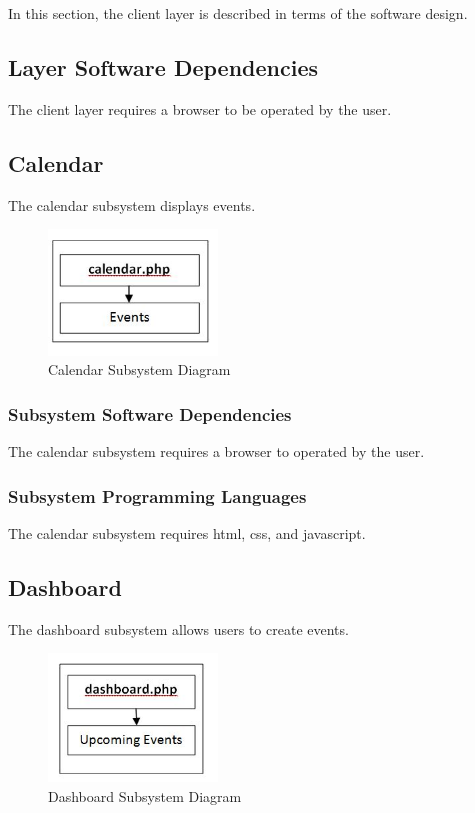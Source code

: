 In this section, the client layer is described in terms of the software design.


\subsection{Layer Software Dependencies}
The client layer requires a browser to be operated by the user.

\subsection{Calendar}
The calendar subsystem displays events.

\begin{figure}[h!]
	\centering
 	\includegraphics[width=0.40\textwidth]{images/calendar}
 \caption{Calendar Subsystem Diagram}
\end{figure}

\subsubsection{Subsystem Software Dependencies}
The calendar subsystem requires a browser to operated by the user.

\subsubsection{Subsystem Programming Languages}
The calendar subsystem requires html, css, and javascript.


\subsection{Dashboard}
The dashboard subsystem allows users to create events.

\begin{figure}[h!]
	\centering
 	\includegraphics[width=0.40\textwidth]{images/dashboard}
 \caption{Dashboard Subsystem Diagram}
\end{figure}


